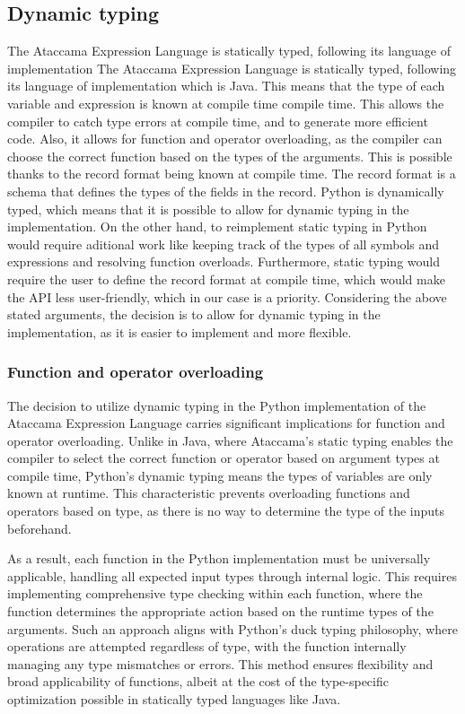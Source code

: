 \subsection{Dynamic typing}

The Ataccama Expression Language is statically typed, following its language of implementation The Ataccama Expression Language is statically typed, following its language
of implementation which is Java. This means that the type of each variable and
expression is known at compile time compile time. This allows the compiler to
catch type errors at compile time, and to generate more efficient code. Also,
it allows for function and operator overloading, as the compiler can choose the
correct function based on the types of the arguments.
This is possible thanks to the record format being known at compile time. The
record format is a schema that defines the types of the fields in the record.
Python is dynamically typed, which means that it is possible to allow for
dynamic typing in the implementation.
On the other hand, to reimplement static typing in Python would require
aditional work like keeping track of the types of all symbols and expressions and
resolving function overloads.
Furthermore, static typing would require the user to define the record format
at compile time, which would make the API less user-friendly, which in our case
is a priority.
Considering the above stated arguments, the decision is to allow for dynamic
typing in the implementation, as it is easier to implement and more flexible.

\subsubsection{Function and operator overloading}

The decision to utilize dynamic typing in the Python implementation of the Ataccama Expression Language carries significant implications for function and operator overloading. Unlike in Java, where Ataccama's static typing enables the compiler to select the correct function or operator based on argument types at compile time, Python's dynamic typing means the types of variables are only known at runtime. This characteristic prevents overloading functions and operators based on type, as there is no way to determine the type of the inputs beforehand.

As a result, each function in the Python implementation must be universally applicable, handling all expected input types through internal logic. This requires implementing comprehensive type checking within each function, where the function determines the appropriate action based on the runtime types of the arguments. Such an approach aligns with Python’s duck typing philosophy, where operations are attempted regardless of type, with the function internally managing any type mismatches or errors. This method ensures flexibility and broad applicability of functions, albeit at the cost of the type-specific optimization possible in statically typed languages like Java.

